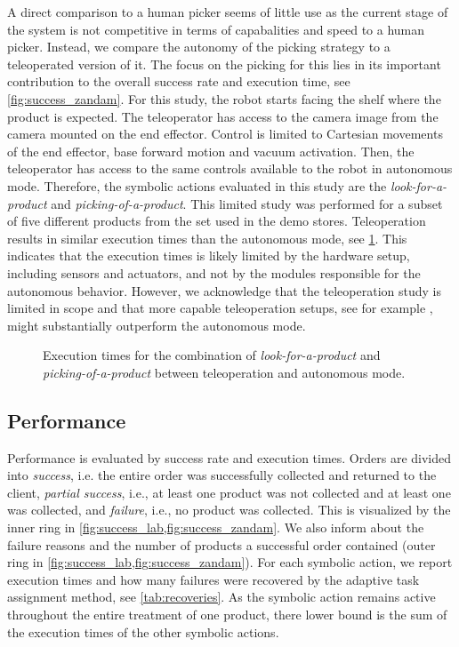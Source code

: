 A direct comparison to a human picker seems of little use as
the current stage of the system is not competitive in terms
of capabalities and speed to a human picker. Instead, 
 we compare the autonomy of
the picking strategy to a teleoperated version of it.
The
focus on the picking for this lies in its important
contribution to the overall success rate and execution time,
see \cref{fig:success_zandam}. For this study, the robot starts
facing the shelf where the product is expected. The teleoperator
has access to the camera image from the camera mounted on
the end effector. Control is limited to Cartesian movements
of the end effector, base forward motion and vacuum
activation. Then, the teleoperator has access to the same controls
available to the robot in autonomous mode. Therefore, the
symbolic actions evaluated in this study are the
\textit{look-for-a-product} and
\textit{picking-of-a-product}. This limited study was
performed for a subset of five different products from the
set used in the demo stores. Teleoperation results in
similar execution times than the autonomous mode, see
\cref{fig:teleoperation}. This indicates that the 
execution times is likely limited by the hardware setup,
including sensors and actuators, and not by the modules
responsible for the autonomous behavior. However, we acknowledge
that the teleoperation study is limited in scope and that
more capable teleoperation setups, see for example
\cite{behnke202310},
might substantially
outperform the autonomous mode.

\begin{figure}[h]
  \centering
  
  \caption{Execution times for the combination
  of \textit{look-for-a-product} and
  \textit{picking-of-a-product} between teleoperation and 
  autonomous mode.}
  \label{fig:teleoperation}
\end{figure}
%
\subsection{Performance}
%
Performance is evaluated by success rate and execution
times. Orders are divided into \textit{success}, i.e. the
entire order was successfully collected and returned to the
client, \textit{partial success}, i.e., at least one product
was not collected and at least one was collected, and
\textit{failure}, i.e., no product was collected. This is
visualized by the inner ring in
\cref{fig:success_lab,fig:success_zandam}. We also
inform about the failure reasons and the number
of products a successful order contained (outer ring in
\cref{fig:success_lab,fig:success_zandam}). For each
symbolic action,
we report execution times and how many failures were
recovered by the adaptive task assignment method, see
\cref{tab:recoveries}. As the symbolic action remains active
throughout the entire treatment of one product, there lower
bound is the sum of the execution times of the other
symbolic actions.

